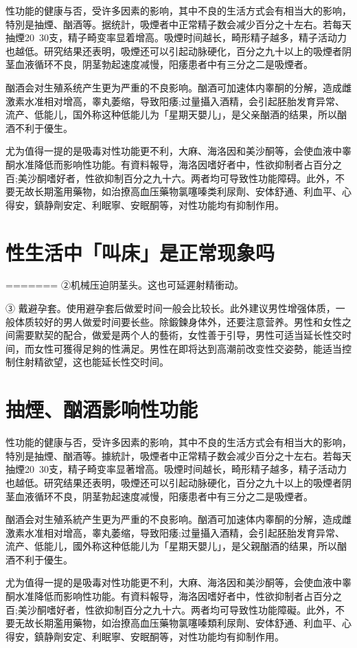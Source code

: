 \documentclass[12pt,UTF8]{ctexbook}
\begin{document}
性功能的健康与否，受许多因素的影响，其中不良的生活方式会有相当大的影响，特別是抽煙、酗酒等。据统計，吸煙者中正常精子数会减少百分之十左右。若每天抽煙20~30支，精子畸变率显着增高。吸煙时间越长，畸形精子越多，精子活动力也越低。研究结果还表明，吸煙还可以引起动脉硬化，百分之九十以上的吸煙者阴茎血液循环不良，阴茎勃起速度减慢，阳痿患者中有三分之二是吸煙者。

酗酒会对生殖系统产生更为严重的不良影响。酗酒可加速体内睾酮的分解，造成雌激素水准相对增高，睾丸萎缩，导致阳痿;过量攝入酒精，会引起胚胎发育异常、流产、低能儿，国外称这种低能儿为「星期天嬰儿」，是父亲酗酒的结果，所以酗酒不利于優生。

尤为值得一提的是吸毒对性功能更不利，大麻、海洛因和美沙酮等，会使血液中睾酮水准降低而影响性功能。有資料報导，海洛因嗜好者中，性欲抑制者占百分之百;美沙酮嗜好者，性欲抑制百分之九十六。两者均可导致性功能障碍。此外，不要无故长期濫用藥物，如治撩高血压藥物氯噻嗪类利尿劑、安体舒通、利血平、心得安，鎮静劑安定、利眠寧、安眠酮等，对性功能均有抑制作用。

\section{性生活中「叫床」是正常现象吗}
=======
②机械压迫阴茎头。这也可延遲射精衝动。

③ 戴避孕套。使用避孕套后做爱时间一般会比较长。此外建议男性增强体质，一般体质较好的男人做爱时间要长些。除鍛鍊身体外，还要注意营养。男性和女性之间需要默契的配合，做爱是两个人的藝術，女性善于引导，男性可适当延长性交时间，而女性可獲得足夠的性满足。男性在即将达到高潮前改变性交姿勢，能适当控制住射精欲望，这也能延长性交时间。

\section{抽煙、酗酒影响性功能}

性功能的健康与否，受许多因素的影响，其中不良的生活方式会有相当大的影响，特別是抽煙、酗酒等。據統計，吸煙者中正常精子数会减少百分之十左右。若每天抽煙20~30支，精子畸变率显著增高。吸煙时间越长，畸形精子越多，精子活动力也越低。研究结果还表明，吸煙还可以引起动脉硬化，百分之九十以上的吸煙者阴茎血液循环不良，阴茎勃起速度减慢，阳痿患者中有三分之二是吸煙者。

酗酒会对生殖系統产生更为严重的不良影响。酗酒可加速体内睾酮的分解，造成雌激素水准相对增高，睾丸萎缩，导致阳痿;过量攝入酒精，会引起胚胎发育异常、流产、低能儿，國外称这种低能儿为「星期天嬰儿」，是父親酗酒的结果，所以酗酒不利于優生。

尤为值得一提的是吸毒对性功能更不利，大麻、海洛因和美沙酮等，会使血液中睾酮水准降低而影响性功能。有資料報导，海洛因嗜好者中，性欲抑制者占百分之百;美沙酮嗜好者，性欲抑制百分之九十六。两者均可导致性功能障礙。此外，不要无故长期濫用藥物，如治撩高血压藥物氯噻嗪類利尿劑、安体舒通、利血平、心得安，鎮静劑安定、利眠寧、安眠酮等，对性功能均有抑制作用。
\end{document}

